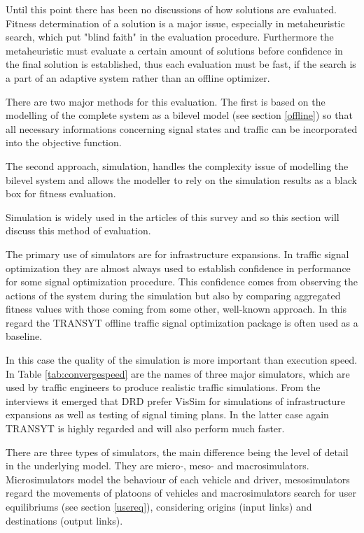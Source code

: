 \label{evaluation}
Until this point there has been no discussions of how solutions are evaluated. Fitness determination of a solution is a major issue, especially in metaheuristic search, which put "blind faith" in the evaluation procedure. Furthermore the metaheuristic must evaluate a certain amount of solutions before confidence in the final solution is established, thus each evaluation must be fast, if the search is a part of an adaptive system rather than an offline optimizer.

There are two major methods for this evaluation. The first is based on the modelling of the complete system as a bilevel model (see section \ref{offline}) so that all necessary informations concerning signal states and traffic can be incorporated into the objective function. 

The second approach, simulation, handles the complexity issue of modelling the bilevel system and allows the modeller to rely on the simulation results as a black box for fitness evaluation. 

Simulation is widely used in the articles of this survey and so this section will discuss this method of evaluation.

The primary use of simulators are for infrastructure expansions. In traffic signal optimization they are almost always used to establish confidence in performance for some signal optimization procedure. This confidence comes from observing the actions of the system during the simulation but also by comparing aggregated fitness values with those coming from some other, well-known approach. In this regard the TRANSYT offline traffic signal optimization package is often used as a baseline. 

In this case the quality of the simulation is more important than execution speed. 
In Table \ref{tab:convergespeed} are the names of three major simulators, which are used by traffic engineers to produce realistic traffic simulations. 
From the interviews it emerged that DRD prefer VisSim for simulations of infrastructure expansions as well as testing of signal timing plans. In the latter case again TRANSYT is highly regarded and will also perform much faster.

There are three types of simulators, the main difference being the level of detail in the underlying model. They are micro-, meso- and macrosimulators. Microsimulators model the behaviour of each vehicle and driver, mesosimulators regard the movements of platoons of vehicles and macrosimulators search for user equilibriums (see section \ref{usereq}), considering origins (input links) and destinations (output links).

